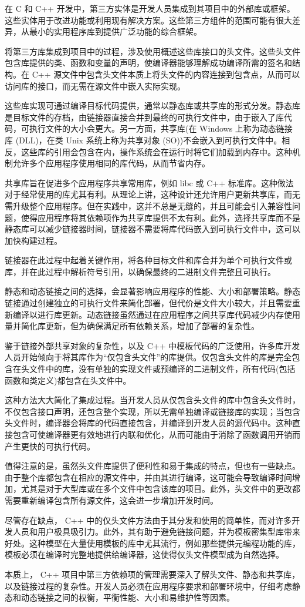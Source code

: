 在 C 和 C++ 开发中，第三方实体是开发人员集成到其项目中的外部库或框架。这些实体用于改进功能或利用现有解决方案。这些第三方组件的范围可能有很大差异，从最小的实用程序库到提供广泛功能的综合框架。

将第三方库集成到项目中的过程，涉及使用概述这些库接口的头文件。这些头文件包含库提供的类、函数和变量的声明，使编译器能够理解成功编译所需的签名和结构。在 C++ 源文件中包含头文件本质上将头文件的内容连接到包含点，从而可以访问库的接口，而无需在源文件中嵌入实际实现。

这些库实现可通过编译目标代码提供，通常以静态库或共享库的形式分发。静态库是目标文件的存档，由链接器直接合并到最终的可执行文件中，由于嵌入了库代码，可执行文件的大小会更大。另一方面，共享库(在 Windows 上称为动态链接库 (DLL)，在类 Unix 系统上称为共享对象 (SO))不会嵌入到可执行文件中。相反，这些库的引用会包含在内，操作系统会在运行时将它们加载到内存中。这种机制允许多个应用程序使用相同的库代码，从而节省内存。

共享库旨在促进多个应用程序共享常用库，例如 libc 或 C++ 标准库。这种做法对于经常使用的库尤其有利。从理论上讲，这种设计还允许用户更新共享库，而无需升级整个应用程序。但在实践中，这并不总是无缝的，并且可能会引入兼容性问题，使得应用程序将其依赖项作为共享库提供不太有利。此外，选择共享库而不是静态库可以减少链接器时间，链接器不需要将库代码嵌入到可执行文件中，这可以加快构建过程。

链接器在此过程中起着关键作用，将各种目标文件和库合并为单个可执行文件或库，并在此过程中解析符号引用，以确保最终的二进制文件完整且可执行。

静态和动态链接之间的选择，会显著影响应用程序的性能、大小和部署策略。静态链接通过创建独立的可执行文件来简化部署，但代价是文件大小较大，并且需要重新编译以进行库更新。动态链接虽然通过在应用程序之间共享库代码减少内存使用量并简化库更新，但为确保满足所有依赖关系，增加了部署的复杂性。

鉴于链接外部共享对象的复杂性，以及 C++ 中模板代码的广泛使用，许多库开发人员开始倾向于将其库作为“仅包含头文件”的库提供。仅包含头文件的库是完全包含在头文件中的库，没有单独的实现文件或预编译的二进制文件，所有代码(包括函数和类定义)都包含在头文件中。

这种方法大大简化了集成过程。当开发人员从仅包含头文件的库中包含头文件时，不仅包含接口声明，还包含整个实现，所以无需单独编译或链接库的实现；当包含头文件时，编译器会将库的代码直接包含，并编译到开发人员的源代码中。这种直接包含可使编译器更有效地进行内联和优化，从而可能由于消除了函数调用开销而产生更快的可执行代码。

值得注意的是，虽然头文件库提供了便利性和易于集成的特点，但也有一些缺点。由于整个库都包含在相应的源文件中，并由其进行编译，这可能会导致编译时间增加，尤其是对于大型库或在多个文件中包含该库的项目。此外，头文件中的更改都需要重新编译包含所有源文件，这会进一步增加开发时间。

尽管存在缺点， C++ 中的仅头文件方法由于其分发和使用的简单性，而对许多开发人员和用户极具吸引力。此外，其有助于避免链接问题，并为模板密集型库带来好处。这种模型在大量使用模板的库中尤其流行，例如那些提供元编程功能的库，模板必须在编译时完整地提供给编译器，这使得仅头文件模型成为自然选择。

本质上， C++ 项目中第三方依赖项的管理需要深入了解头文件、静态和共享库，以及链接过程的复杂性。开发人员必须在应用程序要求和部署环境中，仔细考虑静态和动态链接之间的权衡，平衡性能、大小和易维护性等因素。


